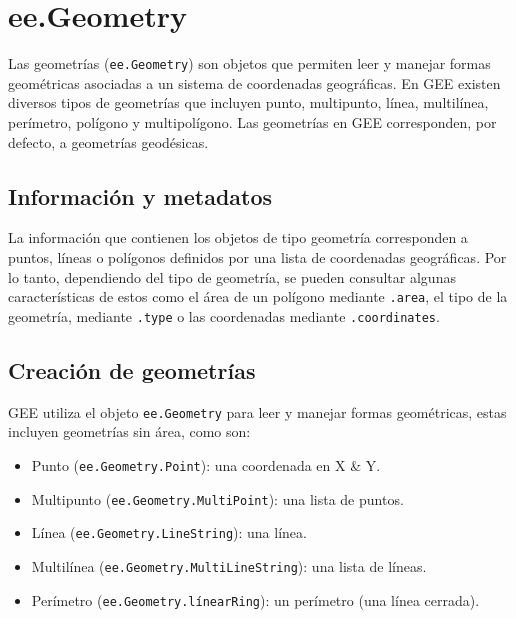 \documentclass[
  12pt,
  letterpaper,
  twoside]{book}
\providecommand{\tightlist}{%
  \setlength{\itemsep}{0pt}\setlength{\parskip}{0pt}}
\begin{document}
\newpage

\hypertarget{ee.geometry}{%
\chapter{ee.Geometry}\label{ee.geometry}}

Las geometrías (\texttt{ee.Geometry}) son objetos que permiten leer y manejar formas geométricas asociadas a un sistema de coordenadas geográficas. En GEE existen diversos tipos de geometrías que incluyen punto, multipunto, línea, multilínea, perímetro, polígono y multipolígono. Las geometrías en GEE corresponden, por defecto, a geometrías geodésicas.

\hypertarget{informaciuxf3n-y-metadatos}{%
\section{Información y metadatos}\label{informaciuxf3n-y-metadatos}}

La información que contienen los objetos de tipo geometría corresponden a puntos, líneas o polígonos definidos por una lista de coordenadas geográficas. Por lo tanto, dependiendo del tipo de geometría, se pueden consultar algunas características de estos como el área de un polígono mediante \texttt{.area}, el tipo de la geometría, mediante \texttt{.type} o las coordenadas mediante \texttt{.coordinates}.

\hypertarget{creaciuxf3n-de-geometruxedas}{%
\section{Creación de geometrías}\label{creaciuxf3n-de-geometruxedas}}

GEE utiliza el objeto \texttt{ee.Geometry} para leer y manejar formas geométricas, estas incluyen geometrías sin área, como son:

\begin{itemize}
\tightlist
\item
  Punto (\texttt{ee.Geometry.Point}): una coordenada en X \& Y.
\item
  Multipunto (\texttt{ee.Geometry.MultiPoint}): una lista de puntos.
\item
  Línea (\texttt{ee.Geometry.LineString}): una línea.
\item
  Multilínea (\texttt{ee.Geometry.MultiLineString}): una lista de líneas.
\item
  Perímetro (\texttt{ee.Geometry.línearRing}): un perímetro (una línea cerrada).
\end{itemize}
\end{document}
